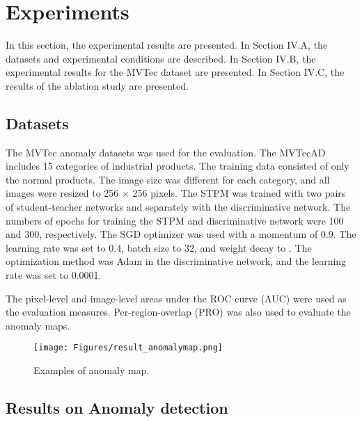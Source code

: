 \documentclass[letterpaper, 10 pt, conference]{ieeeconf}
\begin{document}
\section{Experiments}

In this section, the experimental results are presented. In Section IV.A, the datasets and experimental conditions are described. In Section IV.B, the experimental results for the MVTec dataset are presented. In Section IV.C,  the results of the ablation study are presented.

\subsection{Datasets} 

The MVTec anomaly datasets\cite{c2} was used for the evaluation. The MVTecAD includes 15 categories of industrial products. The training data consisted of only the normal products. The image size was different for each category, and all images were resized to 256 × 256 pixels. The STPM was trained with two pairs of student-teacher networks and separately with the discriminative network. The numbers of epochs for training the STPM and discriminative network were 100 and 300, respectively. The SGD optimizer was used with a momentum of 0.9. The learning rate was set to 0.4, batch size to 32, and weight decay to . The optimization method was Adam in the discriminative network, and the learning rate was set to 0.0001.


The pixel-level and image-level areas under the ROC curve (AUC) were used as the evaluation measures. Per-region-overlap (PRO)\cite{c1} was also used to evaluate the anomaly maps.


\begin{figure}[t]
\begin{center}
\vspace{0.2cm}
\texttt{[image: Figures/result\_anomalymap.png]}
\end{center}
\caption{Examples of anomaly map.}
\label{f7}
\end{figure}

\subsection{Results on Anomaly detection}
\end{document}
